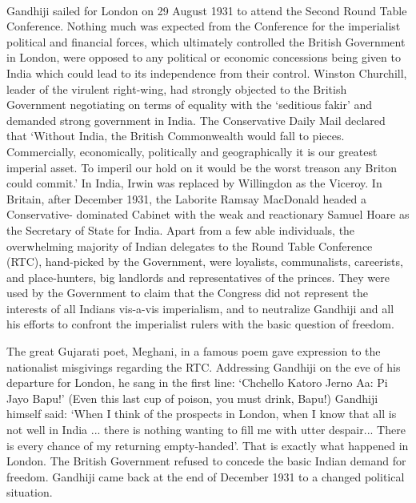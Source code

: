 \paragraph*{}


Gandhiji sailed for London on 29 August 1931 to attend the Second Round Table Conference. Nothing much was expected from the Conference for the imperialist political and financial forces, which ultimately controlled the British Government in London, were opposed to any political or economic concessions being given to India which could lead to its independence from their control. Winston Churchill, leader of the virulent right-wing, had strongly objected to the British Government negotiating on terms of equality with the `seditious fakir' and demanded strong government in India. The Conservative Daily Mail declared that `Without India, the British Commonwealth would fall to pieces. Commercially, economically, politically and geographically it is our greatest imperial asset. To imperil our hold on it would be the worst treason any Briton could commit.' In India, Irwin was replaced by Willingdon as the Viceroy. In Britain, after December 1931, the Laborite Ramsay MacDonald headed a Conservative- dominated Cabinet with the weak and reactionary Samuel Hoare as the Secretary of State for India. Apart from a few able individuals, the overwhelming majority of Indian delegates to the Round Table Conference (RTC), hand-picked by the Government, were loyalists, communalists, careerists, and place-hunters, big landlords and representatives of the princes. They were used by the Government to claim that the Congress did not represent the interests of all Indians vis-a-vis imperialism, and to neutralize Gandhiji and all his efforts to confront the imperialist rulers with the basic question of freedom. 

The great Gujarati poet, Meghani, in a famous poem gave expression to the nationalist misgivings regarding the RTC. Addressing Gandhiji on the eve of his departure for London, he sang in the first line: `Chchello Katoro Jerno Aa: Pi Jayo Bapu!' (Even this last cup of poison, you must drink, Bapu!) Gandhiji himself said: `When I think of the prospects in London, when I know that all is not well in India ... there is nothing wanting to fill me with utter despair... There is every chance of my returning empty-handed'. That is exactly what happened in London. The British Government refused to concede the basic Indian demand for freedom. Gandhiji came back at the end of December 1931 to a changed political situation. 

